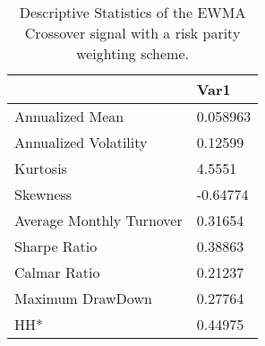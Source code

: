 \begin{table}[H]
\centering
\begin{tabular}{ll}
& Var1 \\ 
\hline 
Annualized Mean & 0.058963 \\ 
Annualized Volatility & 0.12599 \\ 
Kurtosis & 4.5551 \\ 
Skewness & -0.64774 \\ 
Average Monthly Turnover & 0.31654 \\ 
Sharpe Ratio & 0.38863 \\ 
Calmar Ratio & 0.21237 \\ 
Maximum DrawDown & 0.27764 \\ 
HH* & 0.44975 \\ 
\hline
\end{tabular}
\caption{Descriptive Statistics of the EWMA Crossover signal with a risk parity weighting scheme.}
\label{MBBSRPOQ}
\end{table}